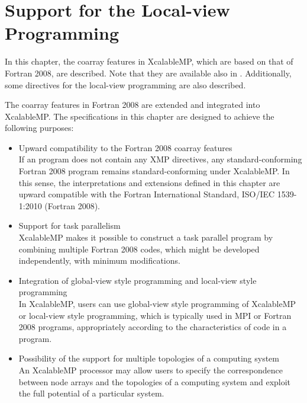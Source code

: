 \chapter{Support for the Local-view Programming}
\label{chap:Support for the Local-view Programming}

In this chapter, the coarray features in XcalableMP, which are based on
that of Fortran 2008, are described. Note that they are available also
in {\XMPC}. Additionally, some directives for the local-view programming
are also described.


The coarray features in Fortran 2008 are extended and integrated into
XcalableMP. The specifications in this chapter are designed to achieve
the following purposes:

\begin{itemize}
 \item Upward compatibility to the Fortran 2008 coarray features\\
If an {\XMPF} program does not contain any XMP directives,
any standard-conforming Fortran 2008 program
remains standard-conforming under XcalableMP.
In this sense, the interpretations and extensions defined in this
 chapter are upward compatible with the Fortran International Standard, ISO/IEC 1539-1:2010 (Fortran 2008).

 \item Support for task parallelism \\
       XcalableMP makes it possible to construct a task parallel program by
       combining multiple Fortran 2008 codes, which might be developed
       independently, with minimum modifications.

 \item Integration of global-view style programming and local-view style programming\\
       In XcalableMP, users can use global-view style programming of
       XcalableMP or local-view style programming, which is typically
       used in MPI or Fortran 2008 programs, appropriately according to
       the characteristics of code in a program.

 \item Possibility of the support for multiple topologies of a computing system\\
       An XcalableMP processor may allow users to specify the correspondence between 
       node arrays and the topologies of a computing system and
       exploit the full potential of a particular system.

\end{itemize}


